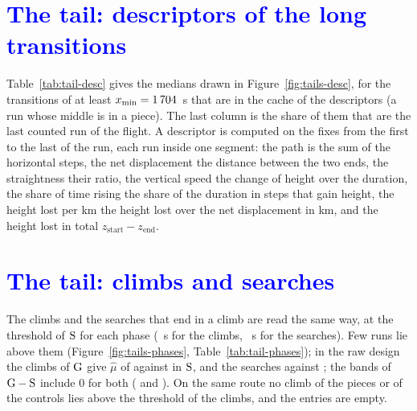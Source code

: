 \begin{table}
\centering\small

\caption{Same flight, transitions at the threshold $x_{\min}=\TlXmin$~s: $\hat\mu$ of the classes in the three readings, runs above, 90\% two-way band and the two errors of Table~\ref{tab:tails}.}
\label{tab:tail-variants}
\end{table}

\section{\texorpdfstring{\textcolor{blue}{The tail: descriptors of the long transitions}}{The tail: descriptors of the long transitions}}\label{app:taildesc}

Table~\ref{tab:tail-desc} gives the medians drawn in Figure~\ref{fig:tails-desc}, for the transitions of at least $x_{\min}=\TlXmin$~s that are in the cache of the descriptors (a run whose middle is in a piece). The last column is the share of them that are the last counted run of the flight. A descriptor is computed on the fixes from the first to the last of the run, each run inside one segment: the path is the sum of the horizontal steps, the net displacement the distance between the two ends, the straightness their ratio, the vertical speed the change of height over the duration, the share of time rising the share of the duration in steps that gain height, the height lost per km the height lost over the net displacement in km, and the height lost in total $z_\text{start}-z_\text{end}$.

\begin{table}
\centering\scriptsize
\setlength{\tabcolsep}{3pt}

\caption{Medians of the descriptors of the long transitions: glides, path (km), straightness, vertical speed (m/s), height lost per km of net displacement (m/km), share of time rising, height lost in total (m), and share of the glides that end the flight (\%). On the same route a run weighs as in the estimates.}
\label{tab:tail-desc}
\end{table}

\section{\texorpdfstring{\textcolor{blue}{The tail: climbs and searches}}{The tail: climbs and searches}}\label{app:tailphases}

The climbs and the searches that end in a climb are read the same way, at the threshold of $\mathrm{S}$ for each phase (\TlXminClimb~s for the climbs, \TlXminSearch~s for the searches). Few runs lie above them (Figure~\ref{fig:tails-phases}, Table~\ref{tab:tail-phases}); in the raw design the climbs of $\mathrm{G}$ give $\hat\mu$ of \TlRawClimbMuG{} \TlRawClimbMuGBand{} against \TlRawClimbMuS{} \TlRawClimbMuSBand{} in $\mathrm{S}$, and the searches \TlRawSearchMuG{} \TlRawSearchMuGBand{} against \TlRawSearchMuS{} \TlRawSearchMuSBand; the bands of $\mathrm{G}-\mathrm{S}$ include 0 for both (\TlRawClimbGapGS{} \TlRawClimbGapGSBand{} and \TlRawSearchGapGS{} \TlRawSearchGapGSBand). On the same route no climb of the pieces or of the controls lies above the threshold of the climbs, and the entries are empty.

